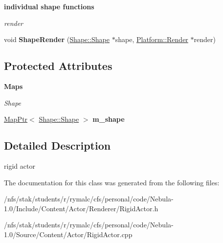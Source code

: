 \begin{Indent}{\bf individual shape functions}\par
{\em \label{_amgrpbe60aab0682f4b9b26e81c6c7416b7c2}
 render }\begin{DoxyCompactItemize}
\item 
\hypertarget{classContent_1_1Actor_1_1RigidActor_a7e4a946d6b144a8cf5a519b7fa99341a}{
void {\bfseries ShapeRender} (\hyperlink{classContent_1_1Shape_1_1Shape}{Shape::Shape} $\ast$shape, \hyperlink{classPlatform_1_1Render}{Platform::Render} $\ast$render)}
\label{classContent_1_1Actor_1_1RigidActor_a7e4a946d6b144a8cf5a519b7fa99341a}

\end{DoxyCompactItemize}
\end{Indent}
\subsection*{Protected Attributes}
\begin{Indent}{\bf Maps}\par
{\em \label{_amgrpaf51fdf94adbb4b6fe4f1275b07df10d}
 Shape }\begin{DoxyCompactItemize}
\item 
\hypertarget{classContent_1_1Actor_1_1RigidActor_abaa00fe1ba8de7189a48d84c0dd09af9}{
\hyperlink{classMapPtr}{MapPtr}$<$ \hyperlink{classContent_1_1Shape_1_1Shape}{Shape::Shape} $>$ {\bfseries m\_\-shape}}
\label{classContent_1_1Actor_1_1RigidActor_abaa00fe1ba8de7189a48d84c0dd09af9}

\end{DoxyCompactItemize}
\end{Indent}


\subsection{Detailed Description}
rigid actor 

The documentation for this class was generated from the following files:\begin{DoxyCompactItemize}
\item 
/nfs/stak/students/r/rymalc/cfs/personal/code/Nebula-\/1.0/Include/Content/Actor/Renderer/RigidActor.h\item 
/nfs/stak/students/r/rymalc/cfs/personal/code/Nebula-\/1.0/Source/Content/Actor/RigidActor.cpp\end{DoxyCompactItemize}
